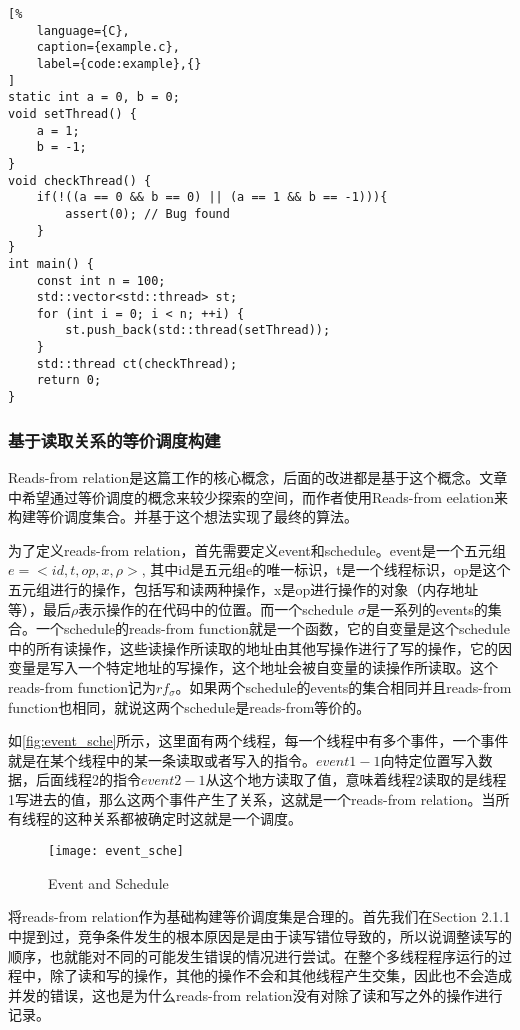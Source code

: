 \begin{spacing}{1.0}
\begin{lstlisting}[%
    language={C},
    caption={example.c},
    label={code:example},{}
]
static int a = 0, b = 0;
void setThread() {
    a = 1;
    b = -1;
}
void checkThread() {
    if(!((a == 0 && b == 0) || (a == 1 && b == -1))){
        assert(0); // Bug found
    }
}
int main() {
    const int n = 100;
    std::vector<std::thread> st;
    for (int i = 0; i < n; ++i) {
        st.push_back(std::thread(setThread));
    }
    std::thread ct(checkThread);
    return 0;
}
\end{lstlisting}
\end{spacing}

\subsubsection{基于读取关系的等价调度构建}

Reads-from relation是这篇工作的核心概念，后面的改进都是基于这个概念。文章中希望通过等价调度的概念来较少探索的空间，而作者使用Reads-from eelation来构建等价调度集合。并基于这个想法实现了最终的算法。

为了定义reads-from relation，首先需要定义event和schedule。event是一个五元组$e = <id, t, op, x, \rho>$, 其中id是五元组e的唯一标识，t是一个线程标识，op是这个五元组进行的操作，包括写和读两种操作，x是op进行操作的对象（内存地址等），最后$\rho$表示操作的在代码中的位置。而一个schedule $\sigma$是一系列的events的集合。一个schedule的reads-from function就是一个函数，它的自变量是这个schedule中的所有读操作，这些读操作所读取的地址由其他写操作进行了写的操作，它的因变量是写入一个特定地址的写操作，这个地址会被自变量的读操作所读取。这个reads-from function记为$rf_{\sigma}$。如果两个schedule的events的集合相同并且reads-from function也相同，就说这两个schedule是reads-from等价的。

如\autoref{fig:event_sche}所示，这里面有两个线程，每一个线程中有多个事件，一个事件就是在某个线程中的某一条读取或者写入的指令。$event1-1$向特定位置写入数据，后面线程2的指令$event2-1$从这个地方读取了值，意味着线程2读取的是线程1写进去的值，那么这两个事件产生了关系，这就是一个reads-from relation。当所有线程的这种关系都被确定时这就是一个调度。

\begin{figure}[ht]
    \centering
    \texttt{[image: event\_sche]}
    \caption{\label{fig:event_sche}Event and Schedule}
\end{figure}

将reads-from relation作为基础构建等价调度集是合理的。首先我们在Section 2.1.1中提到过，竞争条件发生的根本原因是是由于读写错位导致的，所以说调整读写的顺序，也就能对不同的可能发生错误的情况进行尝试。在整个多线程程序运行的过程中，除了读和写的操作，其他的操作不会和其他线程产生交集，因此也不会造成并发的错误，这也是为什么reads-from relation没有对除了读和写之外的操作进行记录。


